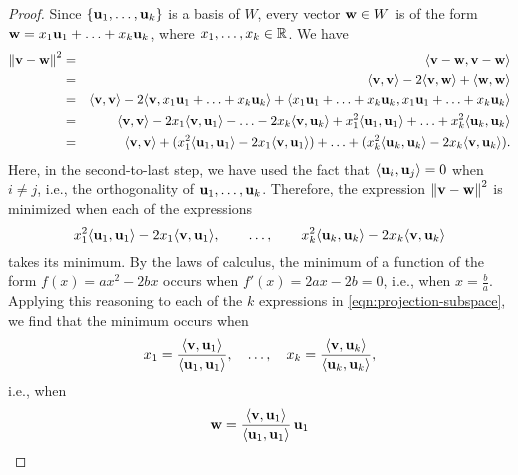 \begin{proof}
  Since $\set{\vect{u}_1,\ldots,\vect{u}_k}$ is a basis of $W$, every
  vector $\vect{w}\in W$ is of the form
  $\vect{w} = x_1\vect{u}_1 + \ldots + x_k\vect{u}_k$, where
  $x_1,\ldots,x_k\in\mathbb{R}$. We have
  \begin{eqnarray*}
    \norm{\vect{v}-\vect{w}}^2
    &=& \iprod{\vect{v}-\vect{w}, \vect{v}-\vect{w}} \\
    &=& \iprod{\vect{v}, \vect{v}} - 2\iprod{\vect{v},\vect{w}} + \iprod{\vect{w},\vect{w}} \\
    &=& \iprod{\vect{v}, \vect{v}} - 2\iprod{\vect{v},x_1\vect{u}_1 + \ldots + x_k\vect{u}_k} + \iprod{x_1\vect{u}_1 + \ldots + x_k\vect{u}_k, x_1\vect{u}_1 + \ldots + x_k\vect{u}_k} \\
    &=& \iprod{\vect{v}, \vect{v}} - 2x_1\iprod{\vect{v},\vect{u}_1} - \ldots - 2x_k\iprod{\vect{v},\vect{u}_k} + x_1^2\iprod{\vect{u}_1, \vect{u}_1} + \ldots + x_k^2\iprod{\vect{u}_k, \vect{u}_k} \\
    &=& \iprod{\vect{v}, \vect{v}} + (x_1^2\iprod{\vect{u}_1, \vect{u}_1} - 2x_1\iprod{\vect{v},\vect{u}_1}) + \ldots + (x_k^2\iprod{\vect{u}_k, \vect{u}_k} - 2x_k\iprod{\vect{v},\vect{u}_k}).
  \end{eqnarray*}
  Here, in the second-to-last step, we have used the fact that
  $\iprod{\vect{u}_i,\vect{u}_j}=0$ when $i\neq j$, i.e., the
  orthogonality of $\vect{u}_1,\ldots,\vect{u}_k$.  Therefore, the
  expression $\norm{\vect{v}-\vect{w}}^2$ is minimized when each of the
  expressions
  \begin{equation}\label{eqn:projection-subspace}
    x_1^2\iprod{\vect{u}_1, \vect{u}_1} - 2x_1\iprod{\vect{v},\vect{u}_1}, \qquad
    \ldots,\qquad
    x_k^2\iprod{\vect{u}_k, \vect{u}_k} - 2x_k\iprod{\vect{v},\vect{u}_k}
  \end{equation}
  takes its minimum. By the laws of calculus, the minimum of a
  function of the form $f(x)=ax^2-2bx$ occurs when $f'(x)=2ax-2b=0$,
  i.e., when $x=\frac{b}{a}$. Applying this reasoning to each of the
  $k$ expressions in {\eqref{eqn:projection-subspace}}, we find that the
  minimum occurs when
  \begin{equation*}
    x_1 = \frac{\iprod{\vect{v},\vect{u}_1}}{\iprod{\vect{u}_1,\vect{u}_1}},\quad
    \ldots,\quad
    x_k = \frac{\iprod{\vect{v},\vect{u}_k}}{\iprod{\vect{u}_k,\vect{u}_k}},
  \end{equation*}
  i.e., when
  \begin{equation*}
    \vect{w} =
    \frac{\iprod{\vect{v},\vect{u}_1}}{\iprod{\vect{u}_1,\vect{u}_1}}\,\vect{u}_1

\end{equation*}
\end{proof}
